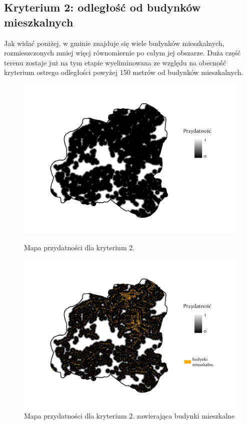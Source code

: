 \documentclass{article}
\begin{document}
\subsection{Kryterium 2: odległość od budynków mieszkalnych}
Jak widać poniżej, w gminie znajduje się wiele budynków mieszkalnych, rozmieszczonych mniej więcj równomiernie po całym jej obszarze. Duża część terenu zostaje już na tym etapie wyeliminowana ze względu na obecność kryterium ostrego odległości powyżej 150 metrów od budynków mieszkalnych.

\begin{figure}[H]
    \begin{minipage}[t]{0.48\textwidth}
        \centering
        \includegraphics[width=\linewidth]{img/plesna-kryterium2-layout.jpg}
        \caption{Mapa przydatności dla kryterium 2.}
        \label{fig:kryterium2-layout}
    \end{minipage}
    \hfill
    \begin{minipage}[t]{0.48\textwidth}
        \centering
        \includegraphics[width=\linewidth]{img/plesna-kryterium2-budynki.jpg}
        \caption{Mapa przydatności dla kryterium 2. zawierająca budynki mieszkalne}
        \label{fig:kryterium2-budynki}
    \end{minipage}
\end{figure}
\end{document}
